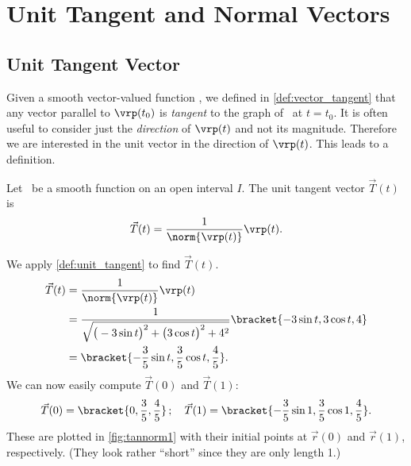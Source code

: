 \section{Unit Tangent and Normal Vectors}\label{sec:tan_norm}

\subsection{Unit Tangent Vector}

Given a smooth vector-valued function \vrt, we defined in \autoref{def:vector_tangent} that any vector parallel to $\vrp(t_0)$ is \emph{tangent} to the graph of \vrt\ at $t=t_0$. It is often useful to consider just the \emph{direction} of $\vrp(t)$ and not its magnitude. Therefore we are interested in the unit vector in the direction of $\vrp(t)$. This leads to a definition.

\begin{definition}\label{def:unit_tangent}
Let \vrt\ be a smooth function on an open interval $I$. The unit tangent vector $\vec T(t)$ is
 
\[\vec T(t) = \frac1{\norm{\vrp(t)}}\vrp(t).\]
\end{definition}


{We apply \autoref{def:unit_tangent} to find $\vec T(t)$. 
\begin{align*}
\vec T(t) &= \frac1{\norm{\vrp(t)}}\vrp(t) \\
				&=\frac{1}{\sqrt{\big(-3\sin t\big)^2+\big(3\cos t\big)^2+ 4^2}}\bracket{-3\sin t,3\cos t, 4}\\
				&=\bracket{-\frac35\sin t,\frac35\cos t,\frac45}.
\end{align*}
We can now easily compute $\vec T(0)$ and $\vec T(1)$:
\[\vec T(0) =\bracket{0,\frac35,\frac45}\,;\quad \vec T(1) =\bracket{-\frac35\sin 1,\frac35\cos 1,\frac45}%
.\]
These are plotted in \autoref{fig:tannorm1} with their initial points at $\vec r(0)$ and $\vec r(1)$, respectively. (They look rather ``short'' since they are only length 1.)
%
}

